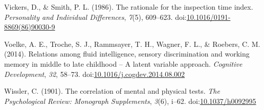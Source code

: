 \documentclass[
  ,man]{apa6}
\newlength{\cslhangindent}
\newenvironment{CSLReferences}[2] %
 {\begin{list}{}{%
  \setlength{\itemindent}{0pt}
  \setlength{\leftmargin}{0pt}
  \setlength{\parsep}{0pt}
  \ifodd #1
   \setlength{\leftmargin}{\cslhangindent}
   \setlength{\itemindent}{-1\cslhangindent}
  \fi
  \setlength{\itemsep}{#2\baselineskip}}}
 {\end{list}}
\begin{document}
\begin{CSLReferences}{1}{0}
Vickers, D., \& Smith, P. L. (1986). The rationale for the inspection time index. \emph{Personality and Individual Differences}, \emph{7}(5), 609--623. doi:\href{https://doi.org/10.1016/0191-8869(86)90030-9}{10.1016/0191-8869(86)90030-9}

Voelke, A. E., Troche, S. J., Rammsayer, T. H., Wagner, F. L., \& Roebers, C. M. (2014). Relations among fluid intelligence, sensory discrimination and working memory in middle to late childhood -- {A} latent variable approach. \emph{Cognitive Development}, \emph{32}, 58--73. doi:\href{https://doi.org/10.1016/j.cogdev.2014.08.002}{10.1016/j.cogdev.2014.08.002}

Wissler, C. (1901). The correlation of mental and physical tests. \emph{The Psychological Review: Monograph Supplements}, \emph{3}(6), i--62. doi:\href{https://doi.org/10.1037/h0092995}{10.1037/h0092995}

\end{CSLReferences}
\end{document}
